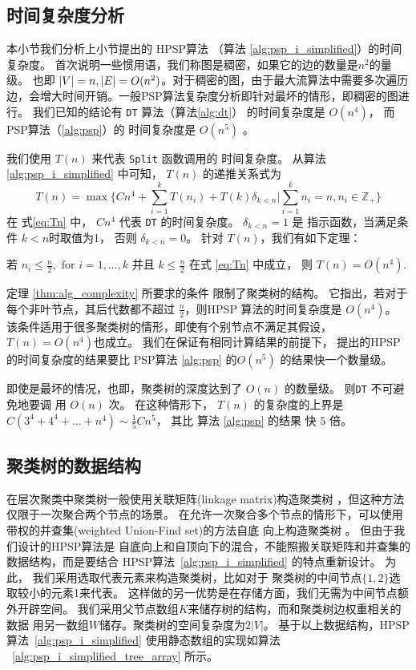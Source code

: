 \subsection{时间复杂度分析}

本小节我们分析上小节提出的 HPSP算法 （算法 \ref{alg:psp_i_simplified}）的时间复杂度。
首次说明一些惯用语，我们称图是稠密，如果它的边的数量是$n^2$的量级。
也即 $\lvert V\rvert = n, \lvert E\rvert = O(n^2)$。对于稠密的图，由于最大流算法中需要多次遍历
边，会增大时间开销。一般PSP算法复杂度分析即针对最坏的情形，即稠密的图进行。
我们已知的结论有 \texttt{DT} 算法（算法\ref{alg:dt}）
的时间复杂度是 $O(n^4)$， 而 PSP算法（\ref{alg:psp}）的 
时间复杂度是 $O(n^5)$ \citep{pin}。

我们使用 $T(n)$ 来代表 
\texttt{Split} 函数调用的
时间复杂度。
从算法 \ref{alg:psp_i_simplified} 中可知，
$T(n)$ 的递推关系式为
\begin{equation}\label{eq:Tn}
T(n) = \max \{ C n^4 + \sum_{i=1}^k T(n_i) +
T(k)\delta_{k<n} |
\sum_{i=1}^k n_i = n, n_i \in \mathbb{Z}_{+} \}
\end{equation}
在 式\eqref{eq:Tn} 中，
$Cn^4$ 代表 \texttt{DT} 的时间复杂度。
$\delta_{k<n} = 1$ 是 指示函数，当满足条件 $k<n$时取值为1，
否则 $\delta_{k<n}=0$。
针对 $T(n)$，我们有如下定理：
\begin{theorem}\label{thm:alg_complexity}
	 若 $n_i \leq \frac{n}{2}, \textrm{ for } i=1,\dots,k$ 并且
   $ k \leq \frac{n}{2}$  在式 \eqref{eq:Tn} 中成立， 
   则 $T(n) = O(n^4)$.
\end{theorem}

定理 \ref{thm:alg_complexity} 所要求的条件
限制了聚类树的结构。
它指出，若对于每个非叶节点，其后代数都不超过 $\frac{n}{2}$，则HPSP
算法的时间复杂度是  $O(n^4)$。
该条件适用于很多聚类树的情形，即使有个别节点不满足其假设，$T(n) = O(n^4)$也成立。
我们在保证有相同计算结果的前提下，
提出的HPSP 的时间复杂度的结果要比
PSP算法 \ref{alg:psp} 的$O(n^5)$ 的结果快一个数量级。

即使是最坏的情况，也即，聚类树的深度达到了 $O(n)$ 的数量级。
则\texttt{DT} 不可避免地要调 用 $O(n)$ 次。
在这种情形下，
$T(n)$ 的复杂度的上界是 $C(3^4+4^4 + \dots + n^4) \sim \frac{1}{5}Cn^5$，
其比 算法 \ref{alg:psp} 的结果
快 $5$ 倍。
\subsection{聚类树的数据结构}
在层次聚类中聚类树一般使用关联矩阵(linkage matrix)构造聚类树
\cite{D2011Modern}，但这种方法
仅限于一次聚合两个节点的场景。
在允许一次聚合多个节点的情形下，可以使用带权的并查集(weighted Union-Find set)的方法自底
向上构造聚类树
\cite{chan2020agglomerative}。 
但由于我们设计的HPSP算法是
自底向上和自顶向下的混合，不能照搬关联矩阵和并查集的数据结构，而是要结合
HPSP算法~\ref{alg:psp_i_simplified} 的特点重新设计。
为此，
我们采用选取代表元素来构造聚类树，比如对于
聚类树的中间节点$\{1,2\}$选取较小的元素1来代表。
这样做的另一优势是在存储方面，我们无需为中间节点额外开辟空间。
我们采用父节点数组$K$来储存树的结构，而和聚类树边权重相关的数据
用另一数组$W$储存。聚类树的空间复杂度为$2|V|$。
基于以上数据结构，HPSP算法~\ref{alg:psp_i_simplified} 
使用静态数组的实现如算法
~\ref{alg:psp_i_simplified_tree_array} 所示。

